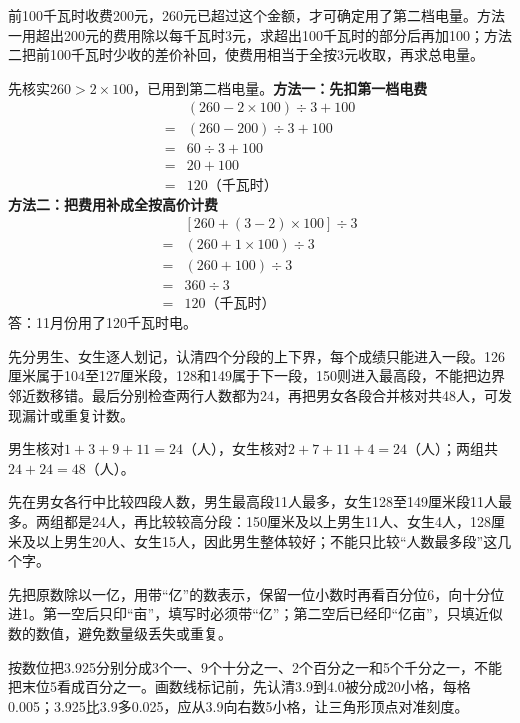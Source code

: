 \documentclass[multi=snippet,border=0pt]{standalone}
\newenvironment{snippet}[3]{\begin{minipage}{#1bp}\color{answerred}\fontsize{#2}{#3}\selectfont\raggedright}{\end{minipage}}
\begin{document}
\begin{snippet}{505}{11.5}{14}前100千瓦时收费200元，260元已超过这个金额，才可确定用了第二档电量。方法一用超出200元的费用除以每千瓦时3元，求超出100千瓦时的部分后再加100；方法二把前100千瓦时少收的差价补回，使费用相当于全按3元收取，再求总电量。\par 先核实\(260>2\times100\)，已用到第二档电量。\textbf{方法一：先扣第一档电费}\[\begin{aligned} &(260-2\times100)\div3+100\\={}&(260-200)\div3+100\\={}&60\div3+100\\={}&20+100\\={}&120\text{（千瓦时）}\end{aligned}\]\textbf{方法二：把费用补成全按高价计费}\[\begin{aligned} &[260+(3-2)\times100]\div3\\={}&(260+1\times100)\div3\\={}&(260+100)\div3\\={}&360\div3\\={}&120\text{（千瓦时）}\end{aligned}\]答：11月份用了120千瓦时电。\end{snippet}
\begin{snippet}{505}{11.5}{14}先分男生、女生逐人划记，认清四个分段的上下界，每个成绩只能进入一段。126厘米属于104至127厘米段，128和149属于下一段，150则进入最高段，不能把边界邻近数移错。最后分别检查两行人数都为24，再把男女各段合并核对共48人，可发现漏计或重复计数。\par 男生核对\(1+3+9+11=24\)（人），女生核对\(2+7+11+4=24\)（人）；两组共\(24+24=48\)（人）。\end{snippet}
\begin{snippet}{505}{11.5}{14}先在男女各行中比较四段人数，男生最高段11人最多，女生128至149厘米段11人最多。两组都是24人，再比较较高分段：150厘米及以上男生11人、女生4人，128厘米及以上男生20人、女生15人，因此男生整体较好；不能只比较“人数最多段”这几个字。\end{snippet}
\begin{snippet}{505}{11.5}{14}先把原数除以一亿，用带“亿”的数表示，保留一位小数时再看百分位6，向十分位进1。第一空后只印“亩”，填写时必须带“亿”；第二空后已经印“亿亩”，只填近似数的数值，避免数量级丢失或重复。\end{snippet}
\begin{snippet}{505}{11.5}{14}按数位把3.925分别分成3个一、9个十分之一、2个百分之一和5个千分之一，不能把末位5看成百分之一。画数线标记前，先认清3.9到4.0被分成20小格，每格0.005；3.925比3.9多0.025，应从3.9向右数5小格，让三角形顶点对准刻度。\end{snippet}
\end{document}
